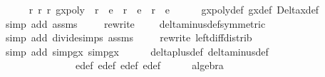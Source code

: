 %
	
\begin{isabellebody}%

\ \ \isamarkupfalse%
\ {\isachardoublequoteopen}{\isasymexists}\ r{}\ r{}\ r{}{\isachardot}\ gxpoly\ {\isacharequal}\ r{}\ {\isacharasterisk}\ e{}\ {\isacharplus}\ r{}\ {\isacharasterisk}\ e{}\ {\isacharplus}\ r{}\ {\isacharasterisk}\ e{}{\isachardoublequoteclose}\isanewline
\ \ \ \ \isamarkupfalse%
\ gxpoly{\isacharunderscore}def\ g\isactrlsub x{\isacharunderscore}def\ Delta\isactrlsub x{\isacharunderscore}def\ \isanewline
\ \ \ \ \isamarkupfalse%
{\isacharparenleft}simp\ add{\isacharcolon}\ assms{\isacharparenleft}{}{\isacharcomma}{}{\isacharparenright}{\isacharparenright}\isanewline
\ \ \ \ \isamarkupfalse%
{\isacharparenleft}rewrite\ \ {\isachardoublequoteopen}{\isacharunderscore}\ {\isacharslash}\ {\isasymhole}{\isachardoublequoteclose}\ delta{\isacharunderscore}minus{\isacharunderscore}def{\isacharbrackleft}symmetric{\isacharbrackright}{\isacharparenright}{\isacharplus}\isanewline
\ \ \ \ \isamarkupfalse%
{\isacharparenleft}simp\ add{\isacharcolon}\ divide{\isacharunderscore}simps\ assms{\isacharparenleft}{}{\isacharcomma}{}{}{\isacharparenright}{\isacharparenright}\isanewline
\ \ \ \ \isamarkupfalse%
{\isacharparenleft}rewrite\ left{\isacharunderscore}diff{\isacharunderscore}distrib{\isacharparenright}\isanewline
\ \ \ \ \isamarkupfalse%
{\isacharparenleft}simp\ add{\isacharcolon}\ simp{}gx\ simp{}gx{\isacharparenright}\isanewline
\ \ \ \ \isamarkupfalse%
\ delta{\isacharunderscore}plus{\isacharunderscore}def\ delta{\isacharunderscore}minus{\isacharunderscore}def\isanewline
\ \ \ \ \ \ \ \ \ \ \ \ \ \ e{}{\isacharunderscore}def\ e{}{\isacharunderscore}def\ e{}{\isacharunderscore}def\ e{\isacharunderscore}def\isanewline
\ \ \ \ \isamarkupfalse%
\ algebra\isanewline

\end{isabellebody}%



